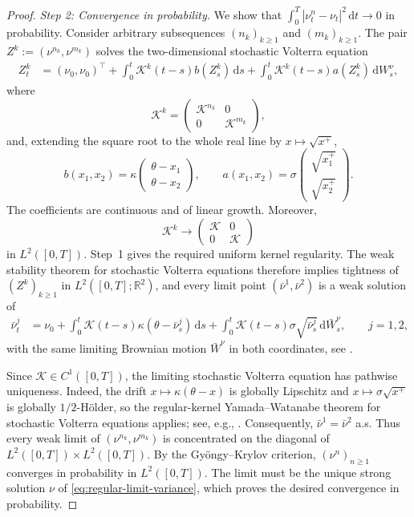 \documentclass[10pt,a4paper,reqno]{amsart}
\theoremstyle{plain}
\theoremstyle{definition}
\theoremstyle{remark}
\theoremstyle{example}
\begin{document}
\begin{proof}
\emph{Step 2: Convergence in probability.}
We show that $\int_0^T |\nu_t^n - \nu_t|^2\, \mathrm{d}t \longrightarrow 0$ in probability. Consider arbitrary subsequences $(n_k)_{k\geq1}$ and $(m_k)_{k\geq1}$. The pair $Z^k:=(\nu^{n_k},\nu^{m_k})$ solves the two-dimensional stochastic Volterra equation
\begin{align*}
    Z_t^k &= (\nu_0,\nu_0)^\top + \int_0^t \bm{\mathcal K}^k(t-s)b(Z_s^k)\,\mathrm ds + \int_0^t \bm{\mathcal K}^k(t-s)a(Z_s^k)\,\mathrm dW_s^\nu,
\end{align*}
where
\[
    \bm{\mathcal K}^k = \begin{pmatrix}
        \mathcal K^{n_k} & 0\\
        0 & \mathcal K^{m_k}
    \end{pmatrix},
\]
and, extending the square root to the whole real line by
$x\mapsto\sqrt{x^+}$,
\[
    b(x_1,x_2) = \kappa \begin{pmatrix} \theta-x_1\\ \theta-x_2 \end{pmatrix},
    \qquad 
    a(x_1,x_2) = \sigma \begin{pmatrix} \sqrt{x_1^+}\\ \sqrt{x_2^+} \end{pmatrix}.
\]
The coefficients are continuous and of linear growth. Moreover,
\[
    \bm{\mathcal K}^k \longrightarrow \begin{pmatrix} \mathcal K&0\\ 0&\mathcal K \end{pmatrix}
\]
in $L^2([0,T])$. Step~1 gives the required uniform kernel regularity. The weak stability theorem for stochastic Volterra equations therefore implies tightness of $(Z^k)_{k\geq1}$ in $L^2([0,T];\mathbb R^2)$, and every limit point $(\bar\nu^1,\bar\nu^2)$ is a weak solution of
\begin{align}
    \bar\nu_t^j &= \nu_0 + \int_0^t \mathcal K(t-s)\kappa(\theta-\bar\nu_s^j)\,\mathrm ds + \int_0^t \mathcal K(t-s)\sigma\sqrt{\bar\nu_s^j}\, \mathrm d\bar W_s^\nu, \qquad j=1,2, \label{eq:doubled-limit-variance}
\end{align}
with the same limiting Brownian motion $\bar W^\nu$ in both coordinates, see \cite[Thm.~7.5]{MR4350978}. 

Since $\mathcal K\in C^1([0,T])$, the limiting stochastic Volterra equation has pathwise uniqueness. Indeed, the drift $x\mapsto\kappa(\theta-x)$ is globally Lipschitz and $x\mapsto\sigma\sqrt{x^+}$ is globally $1/2$-H\"older, so the regular-kernel Yamada--Watanabe theorem for stochastic Volterra equations applies; see, e.g., \cite[Thm.~2.3 and Cor.~2.6]{MR4578147}. Consequently, $\bar\nu^1=\bar\nu^2$ a.s. Thus every weak limit of $(\nu^{n_k},\nu^{m_k})$ is concentrated on the diagonal of $L^2([0,T])\times L^2([0,T])$. By the Gy\"ongy--Krylov criterion, $(\nu^n)_{n\geq1}$ converges in probability in $L^2([0,T])$. The limit must be the unique strong solution $\nu$ of \eqref{eq:regular-limit-variance}, which proves the desired convergence in probability.


\end{proof}
\end{document}
